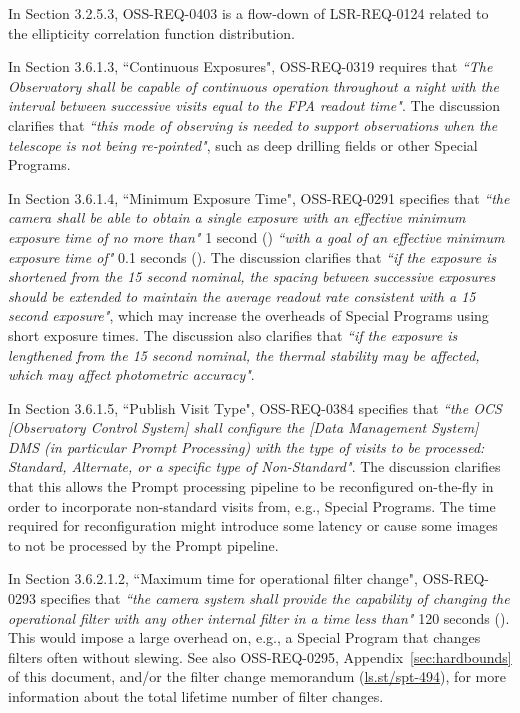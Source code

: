 In Section 3.2.5.3, OSS-REQ-0403 is a flow-down of LSR-REQ-0124 related to the ellipticity correlation function distribution.

In Section 3.6.1.3, ``Continuous Exposures", OSS-REQ-0319 requires that {\it ``The Observatory shall be capable of continuous operation throughout a night with the interval between successive visits equal to the FPA readout time"}.
The discussion clarifies that {\it ``this mode of observing is needed to support observations when the telescope is not being re-pointed"}, such as deep drilling fields or other Special Programs.

In Section 3.6.1.4, ``Minimum Exposure Time", OSS-REQ-0291 specifies that {\it ``the camera shall be able to obtain a single exposure with an effective minimum exposure time of no more than"} 1 second () {\it ``with a goal of an effective minimum exposure time of"} 0.1 seconds (). 
The discussion clarifies that {\it ``if the exposure is shortened from the 15 second nominal, the spacing between successive exposures should be extended to maintain the average readout rate consistent with a 15 second exposure"}, which may increase the overheads of Special Programs using short exposure times.
The discussion also clarifies that {\it ``if the exposure is lengthened from the 15 second nominal, the thermal stability may be affected, which may affect photometric accuracy"}.

In Section 3.6.1.5, ``Publish Visit Type", OSS-REQ-0384 specifies that {\it ``the OCS [Observatory Control System] shall configure the [Data Management System] DMS (in particular Prompt Processing) with the type of visits to be processed: Standard, Alternate, or a specific type of Non-Standard"}.
The discussion clarifies that this allows the Prompt processing pipeline to be reconfigured on-the-fly in order to incorporate non-standard visits from, e.g., Special Programs.
The time required for reconfiguration might introduce some latency or cause some images to not be processed by the Prompt pipeline.

In Section 3.6.2.1.2, ``Maximum time for operational filter change", OSS-REQ-0293 specifies that {\it ``the camera system shall provide the capability of changing the operational filter with any other internal filter in a time less than"} 120 seconds ().
This would impose a large overhead on, e.g., a Special Program that changes filters often without slewing.
See also OSS-REQ-0295, Appendix~\ref{sec:hardbounds} of this document, and/or the filter change memorandum (\url{ls.st/spt-494}), for more information about the total lifetime number of filter changes.

